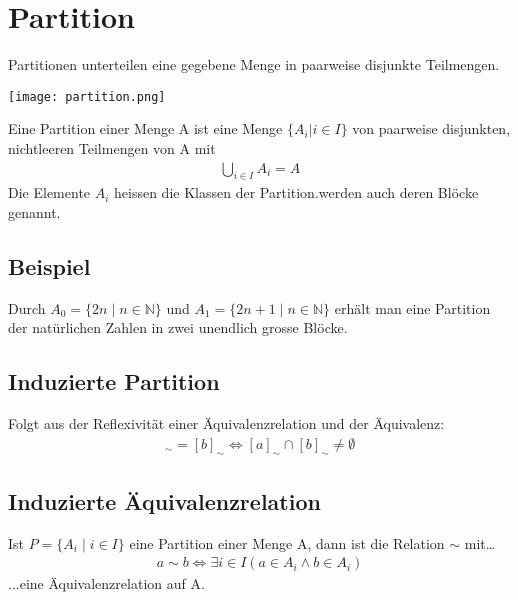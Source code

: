 \section{Partition}
Partitionen unterteilen eine gegebene Menge in paarweise disjunkte
Teilmengen.
\begin{center}
    \texttt{[image: partition.png]}
\end{center}
Eine Partition einer Menge A ist eine Menge $\{A_i | i \in I\}$ von
paarweise disjunkten, nichtleeren Teilmengen von A mit
\begin{align*}
    \bigcup_{i \in I} A_i = A
\end{align*}
Die Elemente $A_i$ heissen die Klassen der Partition.werden auch deren Blöcke genannt.
\subsection{Beispiel}
Durch $A_0 = \{2n \mid n \in \mathbb{N}\}$ und $A_1 = \{2n+1 \mid n \in \mathbb{N}\}$ erhält
man eine Partition der natürlichen Zahlen in zwei unendlich grosse Blöcke.

\subsection{Induzierte Partition}
Folgt aus der Reflexivität einer Äquivalenzrelation und der
Äquivalenz:
\begin{align*}
    [a]_{\sim} = [b]_{\sim} \Leftrightarrow [a]_{\sim} \cap [b]_{\sim} \neq \emptyset
\end{align*}
\subsection{Induzierte Äquivalenzrelation}
Ist $P = \{A_i \mid i \in I \}$ eine Partition einer Menge A, dann ist die Relation $\sim$ mit\dots
\begin{align*}
    a \sim b \Leftrightarrow \exists{i} \in I(a \in A_i \wedge b \in A_i)
\end{align*}
...eine Äquivalenzrelation auf A.